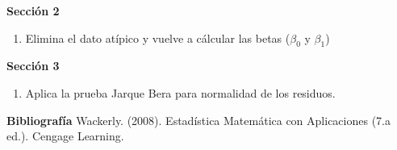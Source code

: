 \documentclass{../oxmathproblems}
\begin{document}
\begin{questions}
\textbf {Sección 2} 
\begin{enumerate}
  \item Elimina el dato atípico y vuelve a cálcular las betas ($\beta_0$ y $\beta_1$)
\end{enumerate}

\textbf {Sección 3} 
\begin{enumerate}
  \item Aplica la prueba Jarque Bera para normalidad de los residuos. 
\end{enumerate}



\textbf{Bibliografía}
Wackerly. (2008). Estadística Matemática con Aplicaciones (7.a ed.). Cengage Learning.



\end{questions}
\end{document}
